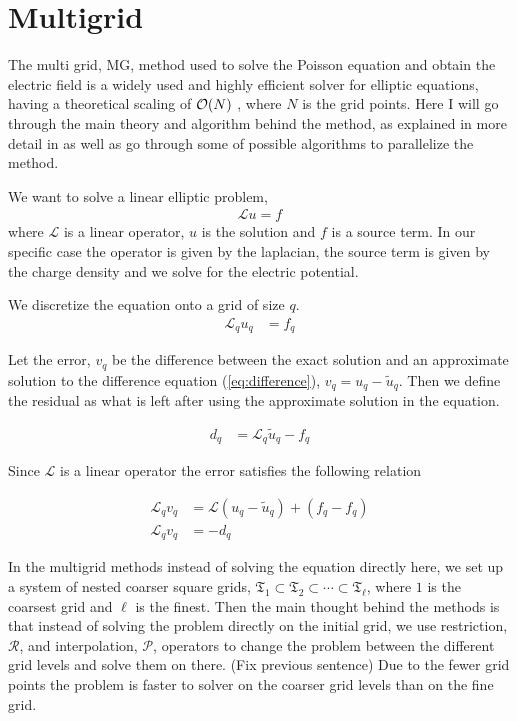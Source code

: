 
\section{Multigrid}
	The multi grid, MG, method used to solve the Poisson equation and obtain the
	electric field is a widely used and highly efficient solver for elliptic equations,
	having a theoretical scaling of \(\order{N}\) \citep{press_numerical_1988},
	where \(N\) is the grid points. Here I will go through the main theory and
	algorithm behind the method, as explained in more detail in \citep{press_numerical_1988,trottenberg_multigrid_2000}
	as well as go through some of possible algorithms to parallelize the method.

	We want to solve a linear elliptic problem,
		\begin{align}
			\mathcal{L} u = f
		\end{align}
	where \(\mathcal{L}\) is a linear operator, \(u\) is the solution and \(f\) is
  a source term. In our specific case the operator is given by the laplacian, the
  source term is given by the charge density and we solve for the electric potential.

	We discretize the equation onto a grid of size \(q\).
	\begin{align}
		\mathcal{L}_q u_q &= f_q \label{eq:difference}
	\end{align}

	Let the error, \(v_q\) be the difference between the exact solution and an approximate
  solution to the difference equation (\ref{eq:difference}), \( v_q = u_q - \tilde{u}_q \).
  Then we define the residual as what is left after using the approximate solution
  in the equation.

	\begin{align}
		d_q &= \mathcal{L}_q \tilde{u}_q - f_q
	\end{align}

	Since \(\mathcal{L}\) is a linear operator the error satisfies the following relation

	\begin{align}
		\mathcal{L}_q v_q &= \mathcal{L}(u_q - \tilde{u}_q)  + (f_q- f_q)
		\\
		\mathcal{L}_q v_q &= - d_q \label{eq:diff_MG}
	\end{align}

	In the multigrid methods instead of solving the equation directly here, we set
	up a system of nested coarser square grids,
	\(\mathfrak{T}_1 \subset \mathfrak{T}_2 \subset \cdots \subset \mathfrak{T}_\ell\),
	where \(1\) is the coarsest grid and \(\ell\) is the finest. Then the main thought
	behind the methods is that instead of solving the problem directly on the initial
	grid, we use restriction, \( \mathcal{R} \), and interpolation, \( \mathcal{P} \),
	operators to change the problem between the different grid levels and solve them
	on there. (Fix previous sentence) Due to the fewer grid points the problem is
	faster to solver on the coarser grid levels than on the fine grid.

